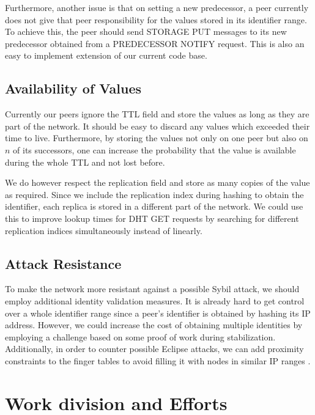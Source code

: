 \documentclass[a4paper, 11pt]{article}
\begin{document}
    Furthermore, another issue is that on setting a new predecessor, a peer currently does not give that peer responsibility for the values stored in its identifier range. To achieve this, the peer should send STORAGE PUT messages to its new predecessor obtained from a PREDECESSOR NOTIFY request. This is also an easy to implement extension of our current code base.
    
    \subsection{Availability of Values}
    
    Currently our peers ignore the TTL field and store the values as long as they are part of the network. It should be easy to discard any values which exceeded their time to live. Furthermore, by storing the values not only on one peer but also on $n$ of its successors, one can increase the probability that the value is available during the whole TTL and not lost before.
    
    We do however respect the replication field and store as many copies of the value as required. Since we include the replication index during hashing to obtain the identifier, each replica is stored in a different part of the network. We could use this to improve lookup times for DHT GET requests by searching for different replication indices simultaneously instead of linearly.
    
    \subsection{Attack Resistance}
    
    To make the network more resistant against a possible Sybil attack, we should employ additional identity validation measures. It is already hard to get control over a whole identifier range since a peer's identifier is obtained by hashing its IP address. However, we could increase the cost of obtaining multiple identities by employing a challenge based on some proof of work during stabilization. Additionally, in order to counter possible Eclipse attacks, we can add proximity constraints to the finger tables to avoid filling it with nodes in similar IP ranges \cite{EclipseAttacks}.
    
    \section{Work division and Efforts}
    
\end{document}
